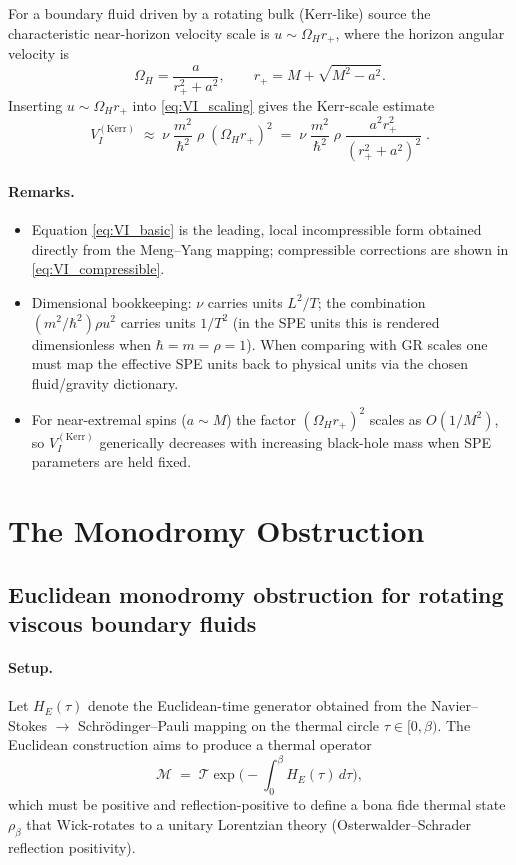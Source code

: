 \documentclass[11pt]{article}
\begin{document}
For a boundary fluid driven by a rotating bulk (Kerr-like) source the characteristic near-horizon velocity scale is \(u\sim\Omega_H r_+\), where the horizon angular velocity is
\[
\Omega_H=\frac{a}{r_+^2+a^2},\qquad r_+=M+\sqrt{M^2-a^2}.
\]
Inserting \(u\sim\Omega_H r_+\) into \eqref{eq:VI_scaling} gives the Kerr-scale estimate
\begin{equation}\label{eq:VI_kerr}
    \boxed{ \;V_I^{\mathrm{(Kerr)}} \;\approx\; \nu\;\frac{m^2}{\hbar^2}\;\rho\;(\Omega_H r_+)^2
    \;=\; \nu\;\frac{m^2}{\hbar^2}\;\rho\;\frac{a^2 r_+^2}{(r_+^2+a^2)^2} \; .\;}
\end{equation}

\paragraph{Remarks.}
\begin{itemize}
  \item Equation \eqref{eq:VI_basic} is the leading, local incompressible form obtained directly from the Meng--Yang mapping; compressible corrections are shown in \eqref{eq:VI_compressible}.
  \item Dimensional bookkeeping: \(\nu\) carries units \(L^2/T\); the combination \((m^2/\hbar^2)\rho u^2\) carries units \(1/T^2\) (in the SPE units this is rendered dimensionless when \(\hbar=m=\rho=1\)). When comparing with GR scales one must map the effective SPE units back to physical units via the chosen fluid/gravity dictionary.
  \item For near-extremal spins (\(a\sim M\)) the factor \((\Omega_H r_+)^2\) scales as \(O(1/M^2)\), so \(V_I^{\mathrm{(Kerr)}}\) generically decreases with increasing black-hole mass when SPE parameters are held fixed.
\end{itemize}


\section{The Monodromy Obstruction}

\subsection*{Euclidean monodromy obstruction for rotating viscous boundary fluids}

\paragraph{Setup.}
Let \(H_E(\tau)\) denote the Euclidean-time generator obtained from the Navier--Stokes \(\to\) Schr\"odinger--Pauli mapping on the thermal circle \(\tau\in[0,\beta)\). The Euclidean construction aims to produce a thermal operator
\begin{equation}\label{eq:monodromy_def}
    \mathcal M \;=\; \mathcal T\exp\Big(-\int_0^\beta H_E(\tau)\,d\tau\Big),
\end{equation}
which must be positive and reflection-positive to define a bona fide thermal state \(\rho_\beta\) that Wick-rotates to a unitary Lorentzian theory (Osterwalder--Schrader reflection positivity).
\end{document}
